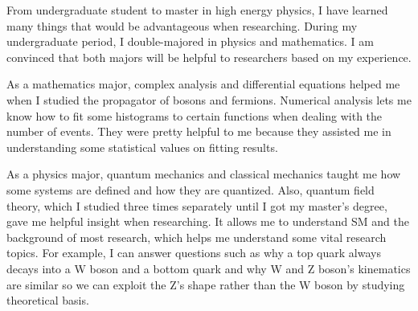 From undergraduate student to master in high energy physics, I have learned many things that would be advantageous when researching. During my undergraduate period, I double-majored in physics and mathematics. I am convinced that both majors will be helpful to researchers based on my experience. 

As a mathematics major, complex analysis and differential equations helped me when I studied the propagator of bosons and fermions. Numerical analysis lets me know how to fit some histograms to certain functions when dealing with the number of events. They were pretty helpful to me because they assisted me in understanding some statistical values on fitting results. 

As a physics major, quantum mechanics and classical mechanics taught me how some systems are defined and how they are quantized. Also, quantum field theory, which I studied three times separately until I got my master's degree, gave me helpful insight when researching. It allows me to understand SM and the background of most research, which helps me understand some vital research topics. For example, I can answer questions such as why a top quark always decays into a W boson and a bottom quark and why W and Z boson's kinematics are similar so we can exploit the Z's shape rather than the W boson by studying theoretical basis.
